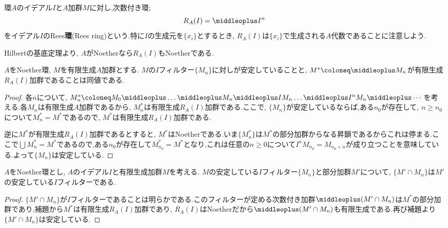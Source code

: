 \begin{defi}[Rees環]
	環$A$のイデアル$I$と$A$加群$M$に対し,次数付き環;
	\[R_A(I)=\middleoplus I^n\]
	をイデアル$I$のRees\textbf{環}(Rees ring)という.特に$I$の生成元を$\{x_i\}$とするとき, $R_A(I)$は$\{x_i\}$で生成される$A$代数であることに注意しよう.
\end{defi}

Hilbertの基底定理より, $A$がNoetherなら$R_A(I)$もNoetherである.

\begin{lem}
	$A$をNoether環, $M$を有限生成$A$加群とする. $M$の$I$フィルター$\{M_n\}$に対しが安定していることと, $M^\ast\coloneq \middleoplus M_n$が有限生成$R_A(I)$加群であることは同値である.
\end{lem}

\begin{proof}
	各$n$について, $M_n^\ast\coloneq M_0\middleoplus\dots\middleoplus M_n\middleoplus IM_n\dots\middleoplus I^nM_n\middleoplus\cdots$を考える.各$M_n$は有限生成$A$加群であるから, $M_n^\ast$は有限生成$R_A(I)$加群である.ここで, $\{M_n\}$が安定しているならば,ある$n_0$が存在して, $n\geq n_0$について$M_n^\ast=M^\ast$であるので, $M^\ast$は有限生成$R_A(I)$加群である.
	
	逆に$M^\ast$が有限生成$R_A(I)$加群であるとすると, $M^\ast$はNoetherである.いま$\{M_n^\ast\}$は$M^\ast$の部分加群からなる昇鎖であるからこれは停まる.ここで$\bigcup M_n^\ast=M^\ast$であるので,ある$n_0$が存在して$M_{n_0}^\ast=M^\ast$となり,これは任意の$n\geq0$について$I^nM_{n_0}=M_{n_0+n}$が成り立つことを意味している.よって$\{M_n\}$は安定している.
\end{proof}

\begin{prop}\label{prop:Artin--Reesの補題}
	$A$をNoether環とし, $A$のイデアル$I$と有限生成加群$M$を考える. $M$の安定している$I$フィルター$\{M_n\}$と部分加群$M'$について, $\{M'\cap M_n\}$は$M'$の安定している$I$フィルターである.
\end{prop}

\begin{proof}
	$\{M'\cap M_n\}$が$I$フィルターであることは明らかである.このフィルターが定める次数付き加群$\middleoplus (M'\cap M_n)$は$M^\ast$の部分加群であり,補題から$M^\ast$は有限生成$R_A(I)$加群であり, $R_A(I)$はNoetherだから$\middleoplus (M'\cap M_n)$も有限生成である.再び補題より$\{M'\cap M_n\}$は安定している.
\end{proof}

